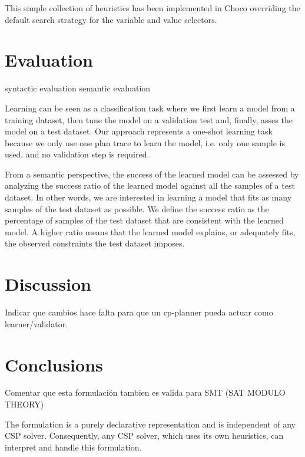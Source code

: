 \documentclass[runningheads]{llncs}
\begin{document}
This simple collection of heuristics has been implemented in \textsf{Choco} overriding the default search strategy for the variable and value selectors. %


\section{Evaluation}
\label{sec:evaluation}

syntactic evaluation
semantic evaluation


Learning can be seen as a classification task where we first learn a model from a training dataset, then tune the model on a validation test and, finally, asses the model on a test dataset. Our approach represents a one-shot learning task because we only use one plan trace to learn the model, i.e. only one sample is used, and no validation step is required.

From a semantic perspective, the success of the learned model can be assessed by analyzing the success ratio of the learned model against all the samples of a test dataset. In other words, we are interested in learning a model that fits as many samples of the test dataset as possible. We define the success ratio as the percentage of samples of the test dataset that are consistent with the learned model. A higher ratio means that the learned model explains, or adequately fits, the observed constraints the test dataset imposes.




\section{Discussion}
\label{sec:discussion}

Indicar que cambios hace falta para que un cp-planner pueda actuar como learner/validator.


\section{Conclusions}
\label{sec:conclusions}


Comentar que esta formulación tambien es valida para SMT (SAT MODULO THEORY)


The formulation is a purely declarative representation and is independent of
any CSP solver. Consequently, any CSP solver, which uses its own heuristics, can interpret and handle this
formulation.
\end{document}
